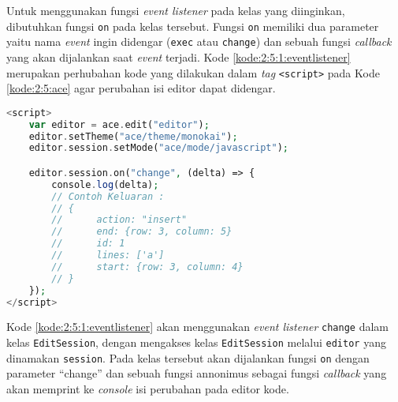 Untuk menggunakan fungsi \textit{event listener} pada kelas yang diinginkan, dibutuhkan fungsi \verb|on| pada kelas tersebut. Fungsi \verb|on| memiliki dua parameter yaitu nama \textit{event} ingin didengar (\verb|exec| atau \verb|change|) dan sebuah fungsi \textit{callback} yang akan dijalankan saat \textit{event} terjadi. Kode \ref{kode:2:5:1:eventlistener} merupakan perhubahan kode yang dilakukan dalam \textit{tag} \verb|<script>| pada Kode \ref{kode:2:5:ace} agar perubahan isi editor dapat didengar.

\begin{lstlisting}[language={php}, caption={Contoh kode event listener}, label={kode:2:5:1:eventlistener}]
<script>
	var editor = ace.edit("editor");
	editor.setTheme("ace/theme/monokai");
	editor.session.setMode("ace/mode/javascript");

	editor.session.on("change", (delta) => {
        console.log(delta);
		// Contoh Keluaran :
		// {
		// 		action: "insert"
		// 		end: {row: 3, column: 5}
		// 		id: 1
		// 		lines: ['a']
		// 		start: {row: 3, column: 4}
		// }
	});
</script>
\end{lstlisting}

Kode \ref{kode:2:5:1:eventlistener} akan menggunakan \textit{event listener} \verb|change| dalam kelas \verb|EditSession|, dengan mengakses kelas \verb|EditSession| melalui \verb|editor| yang dinamakan \verb|session|. Pada kelas tersebut akan dijalankan fungsi \verb|on| dengan parameter ``change'' dan sebuah fungsi annonimus sebagai fungsi \textit{callback} yang akan memprint ke \textit{console} isi perubahan pada editor kode.